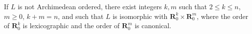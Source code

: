 If $L$ is not Archimedean ordered, there exist integers $k, m$ such that $2 \leq k \leq n$, $m \geq 0$, $k + m = n$, and such that $L$ is isomorphic with $\mathbf{R}_0^k \times \mathbf{R}_0^m$, where the order of $\mathbf{R}_0^k$ is lexicographic and the order of $\mathbf{R}_0^m$ is canonical.
